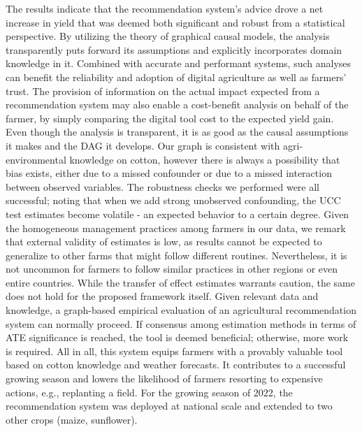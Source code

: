 \documentclass[letterpaper]{article} %
\begin{document}
The results indicate that the recommendation system's advice drove a net increase in yield that was deemed both significant and robust from a statistical perspective. By utilizing the theory of graphical causal models, the analysis transparently puts forward its assumptions and explicitly incorporates domain knowledge in it. Combined with accurate and performant systems, such analyses can benefit the reliability and adoption of digital agriculture as well as farmers' trust. The provision of information on the actual impact expected from a recommendation system may also enable a cost-benefit analysis on behalf of the farmer, by simply comparing the digital tool cost to the expected yield gain.  Even though the analysis is transparent, it is as good as the causal assumptions it makes and the DAG it develops. Our graph is consistent with agri-environmental knowledge on cotton, however there is always a possibility that bias exists, either due to a missed confounder or due to a missed interaction between observed variables. The robustness checks we performed were all successful; noting that when we add strong unobserved confounding, the UCC test estimates become volatile - an expected behavior to a certain degree.  Given the homogeneous management practices among farmers in our data, we remark that external validity of estimates is low, as results cannot be expected to generalize to other farms that might follow different routines. Nevertheless, it is not uncommon for farmers to follow similar practices in other regions or even entire countries. While the transfer of effect estimates warrants caution, the same does not hold for the proposed framework itself. Given relevant data and knowledge, a graph-based empirical evaluation of an agricultural recommendation system can normally proceed. If consensus among estimation methods in terms of ATE significance is reached, the tool is deemed beneficial; otherwise, more work is required.
All in all, this system equips farmers with a provably valuable tool based on cotton knowledge and weather forecasts. It contributes to a successful growing season and lowers the likelihood of farmers resorting to expensive actions, e.g., replanting a field.  For the growing season of 2022, the recommendation system was deployed at national scale and extended to two other crops (maize, sunflower).
\end{document}
